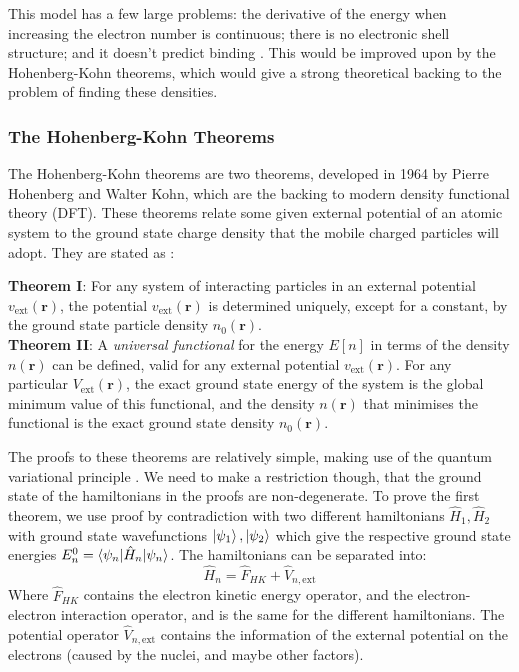 \documentclass[12pt]{article}
\begin{document}
This model has a few large problems: the derivative of the energy when increasing the electron number is continuous; there is no electronic shell structure; and it doesn't predict binding \cite{lieb1977thomas}. This would be improved upon by the Hohenberg-Kohn theorems, which would give a strong theoretical backing to the problem of finding these densities.

\subsubsection{The Hohenberg-Kohn Theorems}
The Hohenberg-Kohn theorems \cite{PhysRev.136.B864} are two theorems, developed in 1964 by Pierre Hohenberg and Walter Kohn, which are the backing to modern density functional theory (DFT). These theorems relate some given external potential of an atomic system to the ground state charge density that the mobile charged particles will adopt. They are stated as \cite{martin_2004}:
\begin{displayquote}
	\textbf{Theorem I}: For any system of interacting particles in an external potential $v_\mathrm{ext}(\mathbf r)$, the potential $v_\mathrm{ext}(\mathbf r)$ is determined uniquely, except for a constant, by the ground state particle density $n_0(\mathbf{r})$.
\\
	\textbf{Theorem II}: A \textit{universal functional} for the energy $E[n]$ in terms of the density $n(\mathbf r)$ can be defined, valid for any external potential $v_\mathrm{ext}(\mathbf r)$.
For any particular $V_\mathrm{ext}(\mathbf r)$, the exact ground state energy of the system is the global minimum value of this functional, and the density $n(\mathbf r)$ that minimises the functional is the exact ground state density $n_0(\mathbf r)$.
\end{displayquote}
The proofs to these theorems are relatively simple, making use of the quantum variational principle \cite{shankar2012principles}. We need to make a restriction though, that the ground state of the hamiltonians in the proofs are non-degenerate.
To prove the first theorem, we use proof by contradiction with two different hamiltonians $\hat H_1, \hat H_2$ with ground state wavefunctions $\ket{\psi_1}, \ket{\psi_2}$ which give the respective ground state energies $E^0_n=\braket{\psi_n | \hat H_n | \psi_n}$. 
The hamiltonians can be separated into:
\begin{equation}
\hat H_n = \hat F_{HK} + \hat V_{n, \mathrm{ext}}
\end{equation}
Where $\hat F_{HK}$ contains the electron kinetic energy operator, and the electron-electron interaction operator, and is the same for the different hamiltonians. The potential operator $\hat V_{n, \mathrm{ext}}$ contains the information of the external potential on the electrons (caused by the nuclei, and maybe other factors).
\end{document}
